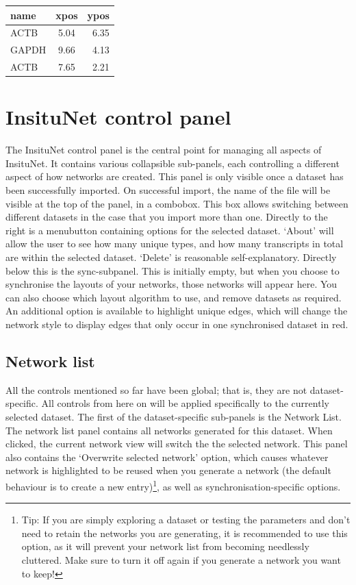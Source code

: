 \documentclass[a4paper,12pt]{article}
\begin{document}
\begin{center}
\begin{tabular}{ l c r }
	\centering
	name & xpos & ypos \\ \hline
	ACTB & 5.04 & 6.35 \\
	GAPDH & 9.66 & 4.13 \\
	ACTB & 7.65 & 2.21 \\
\end{tabular}
\end{center}

\section{InsituNet control panel}

The InsituNet control panel is the central point for managing all aspects of InsituNet. It contains various collapsible sub-panels, each controlling a different aspect of how networks are created. This panel is only visible once a dataset has been successfully imported. On successful import, the name of the file will be visible at the top of the panel, in a combobox. This box allows switching between different datasets in the case that you import more than one. Directly to the right is a menubutton containing options for the selected dataset. `About' will allow the user to see how many unique types, and how many transcripts in total are within the selected dataset. `Delete' is reasonable self-explanatory. Directly below this is the sync-subpanel. This is initially empty, but when you choose to synchronise the layouts of your networks, those networks will appear here. You can also choose which layout algorithm to use, and remove datasets as required. An additional option is available to highlight unique edges, which will change the network style to display edges that only occur in one synchronised dataset in red.

\subsection{Network list}
All the controls mentioned so far have been global; that is, they are not dataset-specific. All controls from here on will be applied specifically to the currently selected dataset. The first of the dataset-specific sub-panels is the Network List. The network list panel contains all networks generated for this dataset. When clicked, the current network view will switch the the selected network. This panel also contains the `Overwrite selected network' option, which causes whatever network is highlighted to be reused when you generate a network (the default behaviour is to create a new entry)\footnote{Tip: If you are simply exploring a dataset or testing the parameters and don't need to retain the networks you are generating, it is recommended to use this option, as it will prevent your network list from becoming needlessly cluttered. Make sure to turn it off again if you generate a network you want to keep!}, as well as synchronisation-specific options.
\end{document}
